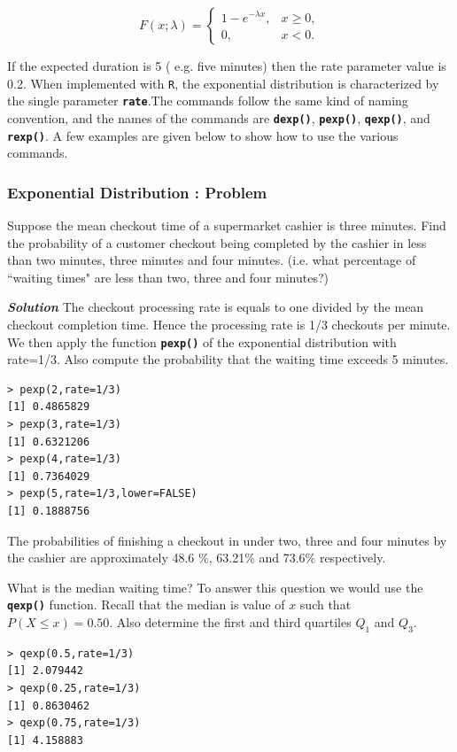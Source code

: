 \documentclass[a4paper,12pt]{article}
\begin{document}
\[
F(x;\lambda) = \begin{cases}
1-e^{-\lambda x}, & x \ge 0, \\
0, & x < 0.
\end{cases}\]

If the expected duration is 5 ( e.g. five minutes) then the rate parameter value is 0.2. When implemented with \texttt{R}, the exponential distribution is characterized by the single parameter \texttt{\textbf{rate}}.The commands follow the same kind of naming convention, and the names of the commands are \texttt{\textbf{dexp()}}, \texttt{\textbf{pexp()}}, \texttt{\textbf{qexp()}}, and \texttt{\textbf{rexp()}}. A few examples are given below to show how to use the various commands. 

\subsubsection{Exponential Distribution : Problem}
Suppose the mean checkout time of a supermarket cashier is three minutes. Find the probability of a customer checkout being completed by the cashier in less than two minutes, three minutes and four minutes. 
(i.e. what percentage of ``waiting times" are less than two, three and four minutes?)

\textbf{\emph{Solution}} The checkout processing rate is equals to one divided by the mean checkout completion time. 
Hence the processing rate is 1/3 checkouts per minute. We then apply the function \texttt{\textbf{pexp()}} of the exponential distribution with rate=1/3. 
Also compute the probability that the waiting time exceeds 5 minutes.
\begin{verbatim}
> pexp(2,rate=1/3)
[1] 0.4865829
> pexp(3,rate=1/3)
[1] 0.6321206
> pexp(4,rate=1/3)
[1] 0.7364029
> pexp(5,rate=1/3,lower=FALSE)
[1] 0.1888756
\end{verbatim}
The probabilities of finishing a checkout in under two, three and four minutes by the cashier are approximately 48.6 \%, 63.21\% and 73.6\% respectively. 

What is the median waiting time? To answer this question we would use the \texttt{\textbf{qexp()}} function. Recall that the median is value of $x$ such that $P(X \leq x) = 0.50$.
Also determine the first and third quartiles $Q_1$ and $Q_3$.
\begin{verbatim}
> qexp(0.5,rate=1/3)
[1] 2.079442
> qexp(0.25,rate=1/3)
[1] 0.8630462
> qexp(0.75,rate=1/3)
[1] 4.158883
\end{verbatim}
\end{document}
